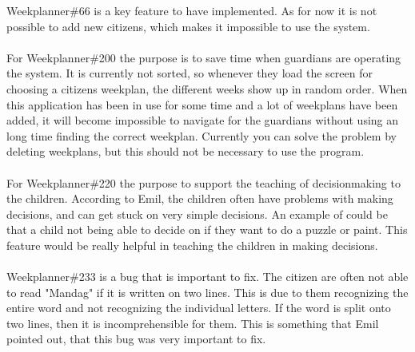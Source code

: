 \noindent
Weekplanner\#66 is a key feature to have implemented. 
As for now it is not possible to add new citizens, which makes it impossible to use the system. 
\\\\
For Weekplanner\#200 the purpose is to save time when guardians are operating the system. 
It is currently not sorted, so whenever they load the screen for choosing a citizens weekplan, the different weeks show up in random order. 
When this application has been in use for some time and a lot of weekplans have been added, it will become impossible to navigate for the guardians without using an long time finding the correct weekplan.
Currently you can solve the problem by deleting weekplans, but this should not be necessary to use the program.
\\\\
For Weekplanner\#220 the purpose to support the teaching of decisionmaking to the children.
According to Emil, the children often have problems with making decisions, and can get stuck on very simple decisions. 
An example of could be that a child not being able to decide on if they want to do a puzzle or paint.
This feature would be really helpful in teaching the children in making decisions.
\\\\
Weekplanner\#233 is a bug that is important to fix. The citizen are often not able to read "Mandag" if it is written on two lines. 
This is due to them recognizing the entire word and not recognizing the individual letters. 
If the word is split onto two lines, then it is incomprehensible for them.
This is something that Emil pointed out, that this bug was very important to fix.

